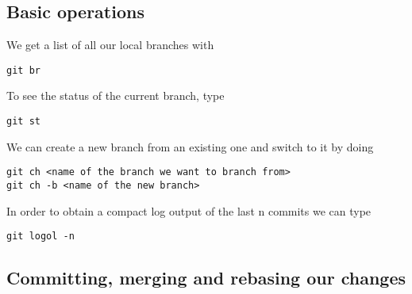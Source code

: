 \documentclass[../Maxima_Workbook.tex]{subfiles}
\begin{document}
\subsection{Basic operations}

\lz We get a list of all our local branches with

\begin{lstlisting}[style=smallblue]
git br
\end{lstlisting}

\lz To see the status of the current branch, type

\begin{lstlisting}[style=smallblue]
git st
\end{lstlisting}

\lz We can create a new branch from an existing one and switch to it by doing

\begin{lstlisting}[style=smallblue]
git ch <name of the branch we want to branch from>
git ch -b <name of the new branch> 
\end{lstlisting}

In order to obtain a compact log output of the last n commits we can type

\begin{lstlisting}[style=smallblue]
git logol -n
\end{lstlisting}

\subsection{Committing, merging and rebasing our changes}
\end{document}
